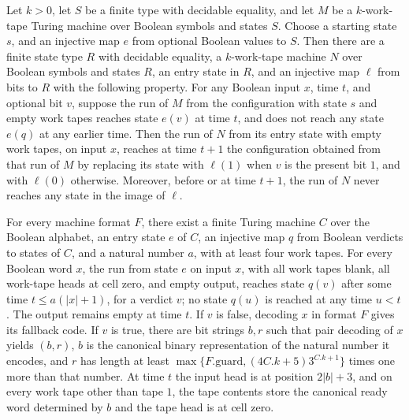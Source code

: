 \begin{lemma}
\label{Turing.MachineFormat.canonExitDispatch}
\leanok
{}
Let $k>0$, let $S$ be a finite type with decidable equality, and let $M$ be a
$k$-work-tape Turing machine over Boolean symbols and states $S$. Choose a starting
state $s$, and an injective map $e$ from optional Boolean values to $S$. Then there are
a finite state type $R$ with decidable equality, a $k$-work-tape machine $N$ over
Boolean symbols and states $R$, an entry state in $R$, and an injective map $\ell$ from
bits to $R$ with the following property. For any Boolean input $x$, time $t$, and
optional bit $v$, suppose the run of $M$ from the configuration with state $s$ and empty
work tapes reaches state $e(v)$ at time $t$, and does not reach any state $e(q)$ at any
earlier time. Then the run of $N$ from its entry state with empty work tapes, on input
$x$, reaches at time $t+1$ the configuration obtained from that run of $M$ by replacing
its state with $\ell(1)$ when $v$ is the present bit $1$, and with $\ell(0)$ otherwise.
Moreover, before or at time $t+1$, the run of $N$ never reaches any state in the image
of $\ell$.
\end{lemma}

\begin{lemma}
\label{Turing.MachineFormat.exists_canonParseFront}
\leanok
{}
For every machine format $F$, there exist a finite Turing machine $C$ over the Boolean
alphabet, an entry state $e$ of $C$, an injective map $q$ from Boolean verdicts to
states of $C$, and a natural number $a$, with at least four work tapes. For every
Boolean word $x$, the run from state $e$ on input $x$, with all work tapes blank, all
work-tape heads at cell zero, and empty output, reaches state $q(v)$ after some time
$t\le a(|x|+1)$, for a verdict $v$; no state $q(u)$ is reached at any time $u<t$. The
output remains empty at time $t$. If $v$ is false, decoding $x$ in format $F$ gives its
fallback code. If $v$ is true, there are bit strings $b,r$ such that pair decoding of
$x$ yields $(b,r)$, $b$ is the canonical binary representation of the natural number it
encodes, and $r$ has length at least $\max\{F.\mathrm{guard},(4C.k+5)3^{C.k+1}\}$ times
one more than that number. At time $t$ the input head is at position $2|b|+3$, and on
every work tape other than tape $1$, the tape contents store the canonical ready word
determined by $b$ and the tape head is at cell zero.
\end{lemma}


